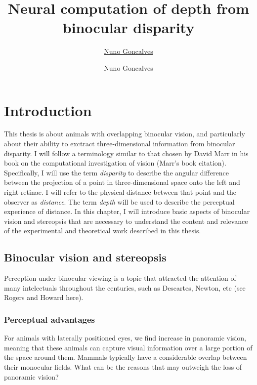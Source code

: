 \documentclass[oneside,12pt]{classes/CUEDthesisPSnPDF}
\title{Neural computation of depth from binocular disparity}
\author{\href{mailto:nrg30@cam.ac.uk}{Nuno Goncalves}}
\author{Nuno Goncalves}
\begin{document}
\chapter{Introduction}
\ifpdf
    \graphicspath{{Introduction/IntroductionFigs/PNG/}{Introduction/IntroductionFigs/PDF/}{Introduction/IntroductionFigs/}}
\else
    \graphicspath{{Introduction/IntroductionFigs/EPS/}{Introduction/IntroductionFigs/}}
\fi

This thesis is about animals with overlapping binocular vision, and particularly about their ability to exctract three-dimensional information from binocular disparity. I will follow a terminology similar to that chosen by David Marr in his book on the computational investigation of vision (Marr's book citation). Specifically, I will use the term \textit{disparity} to describe the angular difference between the projection of a point in three-dimensional space onto the left and right retinae. I will refer to the physical distance between that point and the observer as \textit{distance}. The term \textit{depth} will be used to describe the perceptual experience of distance. In this chapter, I will introduce basic aspects of binocular vision and stereopsis that are necessary to understand the content and relevance of the experimental and theoretical work described in this thesis.  

\section{Binocular vision and stereopsis}
Perception under binocular viewing is a topic that attracted the attention of many intelectuals throughout the centuries, such as Descartes, Newton, etc (see Rogers and Howard here).

\subsection{Perceptual advantages}
For animals with laterally positioned eyes, we find increase in panoramic vision, meaning that these animals can capture visual information over a large portion of the space around them. Mammals typically have a considerable overlap between their monocular fields. What can be the reasons that may outweigh the loss of panoramic vision?
\end{document}
